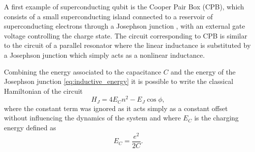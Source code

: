 A first example of superconducting qubit is the Cooper Pair Box (CPB), which consists of a small superconducting island connected to a reservoir of superconducting electrons through a Josephson junction \cite{Vion2002}, with an external gate voltage controlling the charge state.
The circuit corresponding to CPB is similar to the circuit of a parallel resonator where the linear inductance is substituted by a Josephson junction which simply acts as a nonlinear inductance.

Combining the energy associated to the capacitance $C$ and the energy of the Josephson junction \ref{eq:inductive_energy} it is possible to write the classical Hamiltonian of the circuit
\begin{equation}\label{eq:CPB_hamiltonian}
    H_J = 4E_C n^2 - E_J\cos{\phi},
\end{equation}
where the constant term was ignored as it acts simply as a constant offset without influencing the dynamics of the system and where $E_C$ is the charging energy defined as \begin{equation}\label{eq:charging_energy}
    E_C = \frac{e^2}{2C}.
\end{equation}

